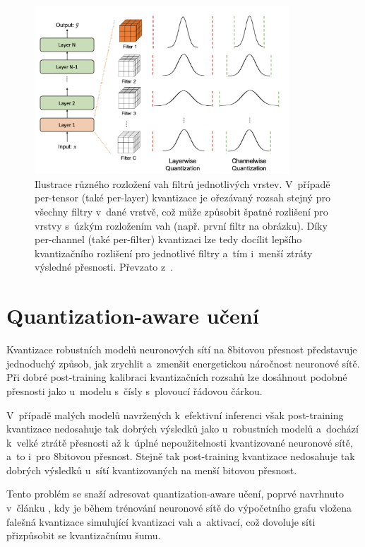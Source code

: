 \begin{figure}[H]
	\centering
	\includegraphics[width=0.85\textwidth]{obrazky-figures/per_channel_quant.png}
	\caption{Ilustrace různého rozložení vah filtrů jednotlivých vrstev. V~případě per-tensor (také per-layer) kvantizace je ořezávaný rozsah stejný pro všechny filtry v~dané vrstvě, což může způsobit špatné rozlišení pro vrstvy s~úzkým rozložením vah (např. první filtr na obrázku). Díky per-channel (také per-filter) kvantizaci lze tedy docílit lepšího kvantizačního rozlišení pro jednotlivé filtry a~tím i~menší ztráty výsledné přesnosti. Převzato z~\cite{gholami2021survey}.}
	\label{quant-per-channel}
\end{figure}

\section{Quantization-aware učení}
\label{section:qat}

Kvantizace robustních modelů neuronových sítí na 8bitovou přesnost představuje jednoduchý způsob, jak zrychlit a~zmenšit energetickou náročnost neuronové sítě. Při dobré post-training kalibraci kvantizačních rozsahů lze dosáhnout podobné přesnosti jako u~modelu s~čísly s~plovoucí řádovou čárkou. 

V~případě malých modelů navržených k~efektivní inferenci však post-training kvantizace nedosahuje tak dobrých výsledků jako u~robustních modelů a~dochází k~velké ztrátě přesnosti až k~úplné nepoužitelnosti kvantizované neuronové sítě, a~to i~pro 8bitovou přesnost. Stejně tak post-training kvantizace nedosahuje tak dobrých výsledků u~sítí kvantizovaných na menší bitovou přesnost.

Tento problém se snaží adresovat quantization-aware učení, poprvé navrhnuto v~článku \cite{https://doi.org/10.48550/arxiv.1712.05877}, kdy je během trénování neuronové sítě do výpočetního grafu vložena falešná kvantizace simulující kvantizaci vah a~aktivací, což dovoluje síti přizpůsobit se kvantizačnímu šumu.

